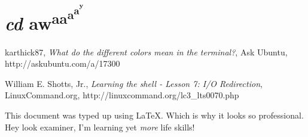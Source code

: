 \documentclass[11pt,twoside,a4paper]{article}
\begin{document}
	\section{\emph{cd} aw\textsuperscript{aa\textsuperscript{a\textsuperscript{a\textsuperscript{\textsuperscript{y}}}}}}



	\newpage
	\begin{thebibliography}{9}

		    karthick87,
		    \emph{What do the different colors mean in the terminal?},
		    Ask Ubuntu,
		    http://askubuntu.com/a/17300

		    William E. Shotts, Jr.,
		    \emph{Learning the shell - Lesson 7: I/O Redirection},
		    LinuxCommand.org,
		    http://linuxcommand.org/lc3\_lts0070.php

	\end{thebibliography}

	\vfill
	This document was typed up using \LaTeX. Which is why it looks so professional. Hey look examiner, I'm learning yet \emph{more} life skills!
\end{document}
